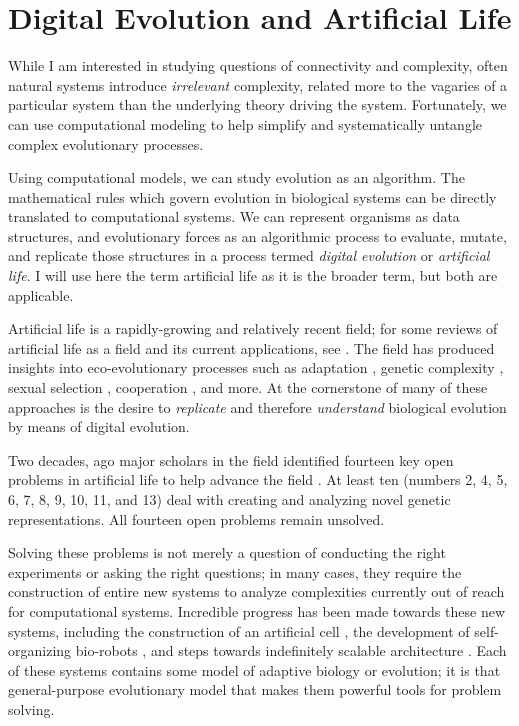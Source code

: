 \section{Digital Evolution and Artificial Life}

While I am interested in studying questions of connectivity and complexity, often natural systems introduce \textit{irrelevant} complexity, related more to the vagaries of a particular system than the underlying theory driving the system.
Fortunately, we can use computational modeling to help simplify and systematically untangle complex evolutionary processes.

Using computational models, we can study evolution as an algorithm. 
The mathematical rules which govern evolution in biological systems can be directly translated to computational systems.  
We can represent organisms as data structures, and evolutionary forces as an algorithmic process to evaluate, mutate, and replicate those structures in a process termed \textit{digital evolution} or \textit{artificial life}. 
I will use here the term artificial life as it is the broader term, but both are applicable.

Artificial life is a rapidly-growing and relatively recent field; for some reviews of artificial life as a field and its current applications, see 
\citep{oneill_digital_2003, mcmullin_thirty_2004, kim_comprehensive_2006, aguilar_past_2014}. 
The field has produced insights into eco-evolutionary processes such as
adaptation \citep{wilke_evolution_2001}, 
genetic complexity \citep{ostman_impact_2011}, 
sexual selection \citep{bohm_sexual_2020},
cooperation \citep{vostinar_spatial_2019}, 
and more.
At the cornerstone of many of these approaches is the desire to \textit{replicate} and therefore \textit{understand} biological evolution by means of digital evolution. 

Two decades, ago major scholars in the field identified fourteen key open problems in artificial life to help advance the field \citep{bedau_open_2000}. 
At least ten (numbers 2, 4, 5, 6, 7, 8, 9, 10, 11, and 13) deal with creating and analyzing novel genetic representations. 
All fourteen open problems remain unsolved.

Solving these problems is not merely a question of conducting the right experiments or asking the right questions; in many cases, they require the construction of entire new systems to analyze complexities currently out of reach for computational systems. 
Incredible progress has been made towards these new systems, including 
the construction of an artificial cell \citep{frischmon_build--cell_2021}, 
the development of self-organizing bio-robots \citep{kriegman_scalable_2020}, and 
steps towards indefinitely scalable architecture \citep{ackley_indefinitely_2014}. 
Each of these systems contains some model of adaptive biology or evolution; it is that general-purpose evolutionary model that makes them powerful tools for problem solving.

